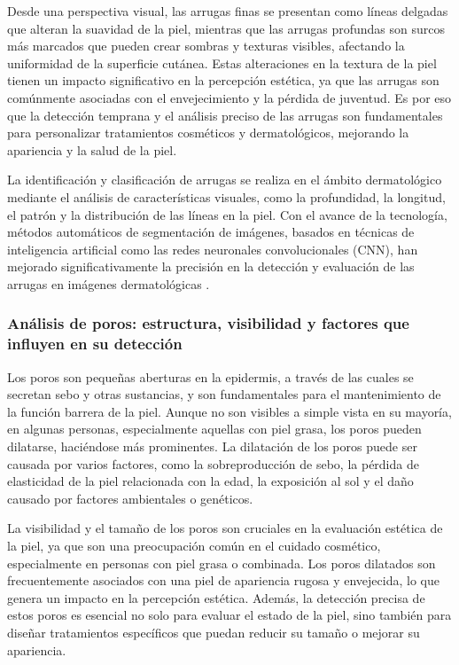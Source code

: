 Desde una perspectiva visual, las arrugas finas se presentan como líneas delgadas que alteran la suavidad de la piel, mientras que las arrugas profundas son surcos más marcados que pueden crear sombras y texturas visibles, afectando la uniformidad de la superficie cutánea. Estas alteraciones en la textura de la piel tienen un impacto significativo en la percepción estética, ya que las arrugas son comúnmente asociadas con el envejecimiento y la pérdida de juventud. Es por eso que la detección temprana y el análisis preciso de las arrugas son fundamentales para personalizar tratamientos cosméticos y dermatológicos, mejorando la apariencia y la salud de la piel.

La identificación y clasificación de arrugas se realiza en el ámbito dermatológico mediante el análisis de características visuales, como la profundidad, la longitud, el patrón y la distribución de las líneas en la piel. Con el avance de la tecnología, métodos automáticos de segmentación de imágenes, basados en técnicas de inteligencia artificial como las redes neuronales convolucionales (CNN), han mejorado significativamente la precisión en la detección y evaluación de las arrugas en imágenes dermatológicas \cite{farage2013}.

\subsubsection{Análisis de poros: estructura, visibilidad y factores que influyen en su detección}
Los poros son pequeñas aberturas en la epidermis, a través de las cuales se secretan sebo y otras sustancias, y son fundamentales para el mantenimiento de la función barrera de la piel. Aunque no son visibles a simple vista en su mayoría, en algunas personas, especialmente aquellas con piel grasa, los poros pueden dilatarse, haciéndose más prominentes. La dilatación de los poros puede ser causada por varios factores, como la sobreproducción de sebo, la pérdida de elasticidad de la piel relacionada con la edad, la exposición al sol y el daño causado por factores ambientales o genéticos.

La visibilidad y el tamaño de los poros son cruciales en la evaluación estética de la piel, ya que son una preocupación común en el cuidado cosmético, especialmente en personas con piel grasa o combinada. Los poros dilatados son frecuentemente asociados con una piel de apariencia rugosa y envejecida, lo que genera un impacto en la percepción estética. Además, la detección precisa de estos poros es esencial no solo para evaluar el estado de la piel, sino también para diseñar tratamientos específicos que puedan reducir su tamaño o mejorar su apariencia. 

